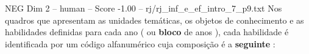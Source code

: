 \begin{textsample}{NEG Dim 2 – human – Score -1.00 – rj/rj\_inf\_e\_ef\_intro\_7\_p9.txt}  \label{ex:f2_neg_010}
Nos quadros que apresentam as unidades temáticas, os objetos de conhecimento e as habilidades definidas para cada ano ( ou \textbf{bloco} de anos ), cada habilidade é identificada por um código alfanumérico cuja composição é a \textbf{seguinte} :

\end{textsample}

